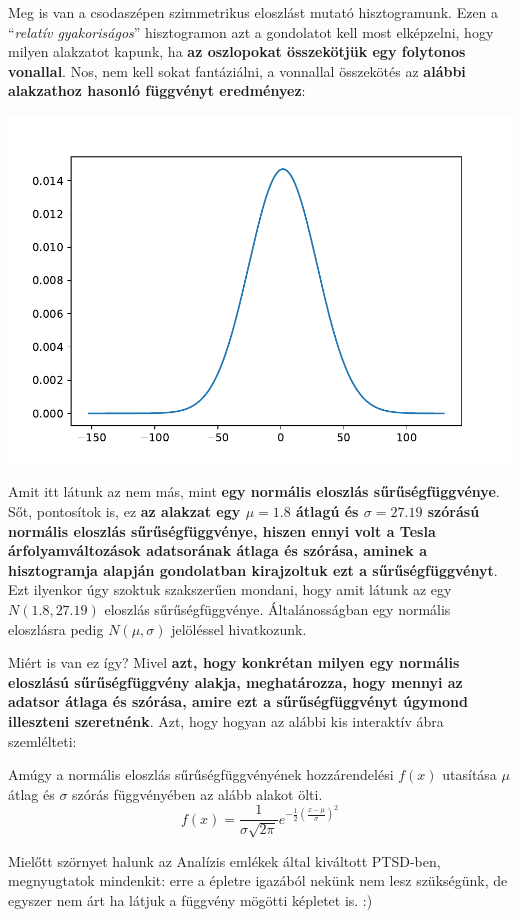\documentclass[
]{book}
\begin{document}
Meg is van a csodaszépen szimmetrikus eloszlást mutató hisztogramunk.
Ezen a ``\emph{relatív gyakoriságos}'' hisztogramon azt a gondolatot kell most elképzelni, hogy milyen alakzatot kapunk, ha \textbf{az oszlopokat összekötjük egy folytonos vonallal}.
Nos, nem kell sokat fantáziálni, a vonnallal összekötés az \textbf{alábbi alakzathoz hasonló függvényt eredményez}:

\includegraphics{_main_files/figure-latex/unnamed-chunk-160-37.pdf}

Amit itt látunk az nem más, mint \textbf{egy normális eloszlás sűrűségfüggvénye}. Sőt, pontosítok is, ez \textbf{az alakzat egy \(\mu=1.8\) átlagú és \(\sigma=27.19\) szórású normális eloszlás sűrűségfüggvénye, hiszen ennyi volt a Tesla árfolyamváltozások adatsorának átlaga és szórása, aminek a hisztogramja alapján gondolatban kirajzoltuk ezt a sűrűségfüggvényt}. Ezt ilyenkor úgy szoktuk szakszerűen mondani, hogy amit látunk az egy \(N(1.8,27.19)\) eloszlás sűrűségfüggvénye. Általánosságban egy normális eloszlásra pedig \(N(\mu, \sigma)\) jelöléssel hivatkozunk.

Miért is van ez így? Mivel \textbf{azt, hogy konkrétan milyen egy normális eloszlású sűrűségfüggvény alakja, meghatározza, hogy mennyi az adatsor átlaga és szórása, amire ezt a sűrűségfüggvényt úgymond illeszteni szeretnénk}. Azt, hogy hogyan az alábbi kis interaktív ábra szemlélteti:

Amúgy a normális eloszlás sűrűségfüggvényének hozzárendelési \(f(x)\) utasítása \(\mu\) átlag és \(\sigma\) szórás függvényében az alább alakot ölti.\[f(x)=\frac{1}{\sigma\sqrt{2\pi}}e^{-\frac{1}{2}\left(\frac{x-\mu}{\sigma}\right)^2}\]

Mielőtt szörnyet halunk az Analízis emlékek által kiváltott PTSD-ben, megnyugtatok mindenkit: erre a épletre igazából nekünk nem lesz szükségünk, de egyszer nem árt ha látjuk a függvény mögötti képletet is. :)
\end{document}
